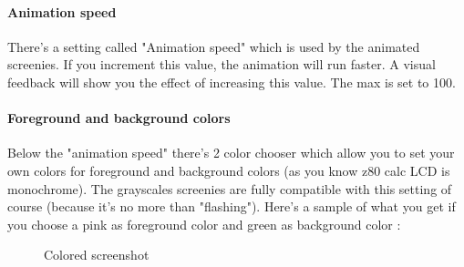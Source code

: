\documentclass[10pt]{report}
\begin{document}
\paragraph{Animation speed}

There's a setting called "Animation speed" which is used by the animated screenies.\newline
If you increment this value, the animation will run faster.\newline
A visual feedback will show you the effect of increasing this value.\newline
The max is set to 100.\newline

\paragraph{Foreground and background colors}

Below the "animation speed" there's 2 color chooser which allow you to set your own colors for foreground and background colors (as you know z80 calc LCD is monochrome).\newline
The grayscales screenies are fully compatible with this setting of course (because it's no more than "flashing").\newline
Here's a sample of what you get if you choose a pink as foreground color and green as background color :\newline
\begin{figure}[H]
\centering
{}
\caption{Colored screenshot}
\end{figure}
\end{document}
